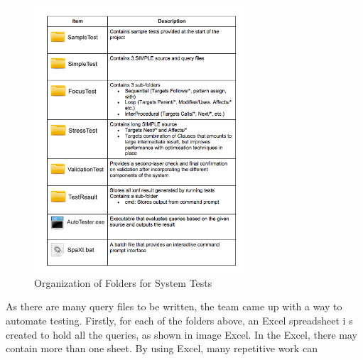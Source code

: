 \documentclass[12pt]{article}
\begin{document}
{{{{{{{{{{{{{\begin{figure}[H]
\includegraphics[width = 0.7\textwidth]{SystemtestingFolder.png}
\caption{Organization of Folders for System Tests}
\end{figure}
As there
are many query
 files to be written, the team came up with a way to automate testing. Firstly, for each of the folders above, an
  Excel spreadsheet i
  s created to hold all the queries, as shown in image Excel. In the Excel, there may contain more than one sheet. By using Excel, many repetitive work can 





























































}}}}}}}}}}}}}
\end{document}
